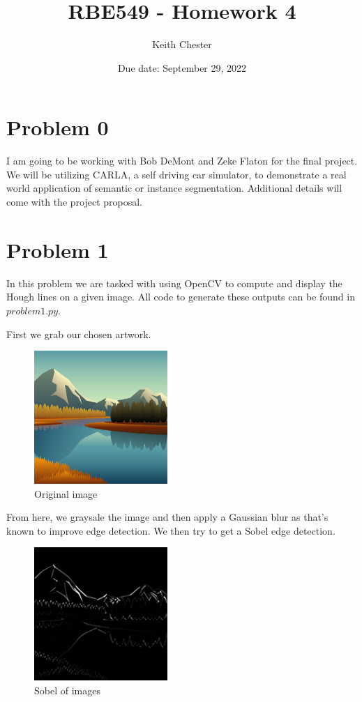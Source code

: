 \documentclass{article}
\title{RBE549 - Homework 4}
\author{Keith Chester}
\date{Due date: September 29, 2022}
\begin{document}
\maketitle

\section*{Problem 0}

I am going to be working with Bob DeMont and Zeke Flaton for the final project. We will be utilizing CARLA, a self driving car simulator, to demonstrate a real world application of semantic or instance segmentation. Additional details will come with the project proposal.


\section*{Problem 1}

In this problem we are tasked with using OpenCV to compute and display the Hough lines on a given image. All code to generate these outputs can be found in $problem1.py$.

First we grab our chosen artwork.

\begin{figure}[H]
    \centering
    \includegraphics[width = 0.45\textwidth]{imgs/original.jpg}
    \caption{Original image}
    \label{fig:1-1}
\end{figure}

From here, we graysale the image and then apply a Gaussian blur as that's known to improve edge detection. We then try to get a Sobel edge detection.

\begin{figure}[H]
    \centering
    \includegraphics[width = 0.45\textwidth]{imgs/sobel.jpg}
    \caption{Sobel of images}
    \label{fig:1-2}
\end{figure}
\end{document}
